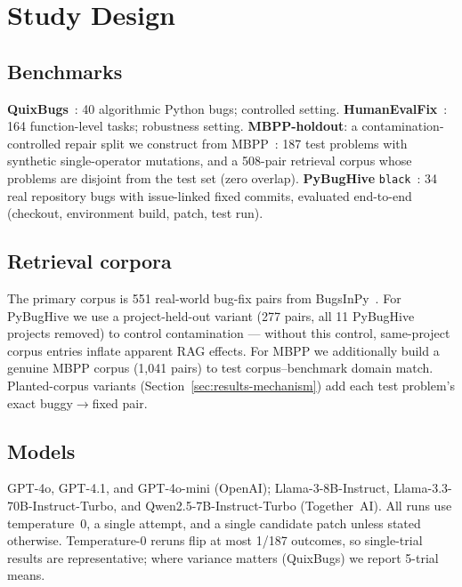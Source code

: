 \section{Study Design}
\label{sec:design}

\subsection{Benchmarks}
\textbf{QuixBugs}~\cite{quixbugs}: 40 algorithmic Python bugs; controlled
setting. \textbf{HumanEvalFix}~\cite{octopack}: 164 function-level tasks;
robustness setting. \textbf{MBPP-holdout}: a contamination-controlled repair
split we construct from MBPP~\cite{mbpp}: 187 test problems with synthetic
single-operator mutations, and a 508-pair retrieval corpus whose problems are
disjoint from the test set (zero overlap). \textbf{PyBugHive}
\texttt{black}~\cite{pybughive}: 34 real repository bugs with issue-linked
fixed commits, evaluated end-to-end (checkout, environment build, patch, test
run).

\subsection{Retrieval corpora}
The primary corpus is 551 real-world bug-fix pairs from
BugsInPy~\cite{bugsinpy}. For PyBugHive we use a project-held-out variant
(277 pairs, all 11 PyBugHive projects removed) to control contamination ---
without this control, same-project corpus entries inflate apparent RAG effects.
For MBPP we additionally build a genuine MBPP corpus (1{,}041 pairs) to test
corpus--benchmark domain match. Planted-corpus variants
(Section~\ref{sec:results-mechanism}) add each test problem's exact
buggy$\to$fixed pair.

\subsection{Models}
GPT-4o, GPT-4.1, and GPT-4o-mini (OpenAI); Llama-3-8B-Instruct,
Llama-3.3-70B-Instruct-Turbo, and Qwen2.5-7B-Instruct-Turbo (Together~AI).
All runs use temperature~0, a single attempt, and a single candidate patch
unless stated otherwise. Temperature-0 reruns flip at most 1/187 outcomes, so
single-trial results are representative; where variance matters (QuixBugs) we
report 5-trial means.

